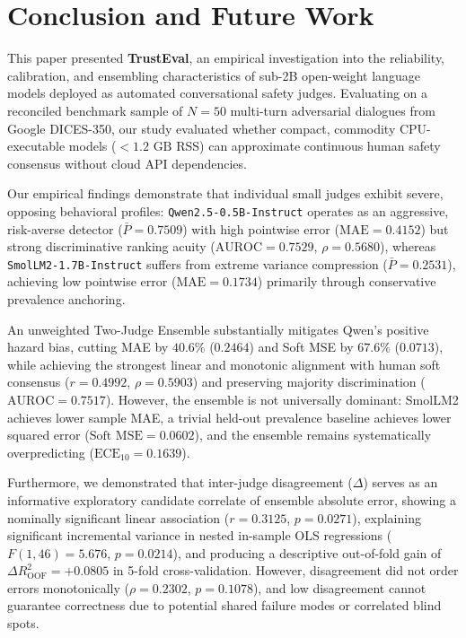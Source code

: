 \section{Conclusion and Future Work}
\label{sec:conclusion}

This paper presented \textbf{TrustEval}, an empirical investigation into the reliability, calibration, and ensembling characteristics of sub-2B open-weight language models deployed as automated conversational safety judges. Evaluating on a reconciled benchmark sample of $N=50$ multi-turn adversarial dialogues from Google DICES-350, our study evaluated whether compact, commodity CPU-executable models ($<1.2\text{ GB}$ RSS) can approximate continuous human safety consensus without cloud API dependencies.

Our empirical findings demonstrate that individual small judges exhibit severe, opposing behavioral profiles: \texttt{Qwen2.5-0.5B-Instruct} operates as an aggressive, risk-averse detector ($\bar{P}=0.7509$) with high pointwise error ($\text{MAE}=0.4152$) but strong discriminative ranking acuity ($\text{AUROC}=0.7529$, $\rho=0.5680$), whereas \texttt{SmolLM2-1.7B-Instruct} suffers from extreme variance compression ($\bar{P}=0.2531$), achieving low pointwise error ($\text{MAE}=0.1734$) primarily through conservative prevalence anchoring. 

An unweighted Two-Judge Ensemble substantially mitigates Qwen's positive hazard bias, cutting MAE by $40.6\%$ ($0.2464$) and Soft MSE by $67.6\%$ ($0.0713$), while achieving the strongest linear and monotonic alignment with human soft consensus ($r=\mathbf{0.4992}$, $\rho=\mathbf{0.5903}$) and preserving majority discrimination ($\text{AUROC}=0.7517$). However, the ensemble is not universally dominant: SmolLM2 achieves lower sample MAE, a trivial held-out prevalence baseline achieves lower squared error ($\text{Soft MSE}=0.0602$), and the ensemble remains systematically overpredicting ($\text{ECE}_{10}=0.1639$).

Furthermore, we demonstrated that inter-judge disagreement ($\Delta$) serves as an informative exploratory candidate correlate of ensemble absolute error, showing a nominally significant linear association ($r=0.3125$, $p=0.0271$), explaining significant incremental variance in nested in-sample OLS regressions ($F(1, 46)=5.676$, $p=0.0214$), and producing a descriptive out-of-fold gain of $\Delta R^2_{\text{OOF}}=+0.0805$ in 5-fold cross-validation. However, disagreement did not order errors monotonically ($\rho=0.2302$, $p=0.1078$), and low disagreement cannot guarantee correctness due to potential shared failure modes or correlated blind spots.

